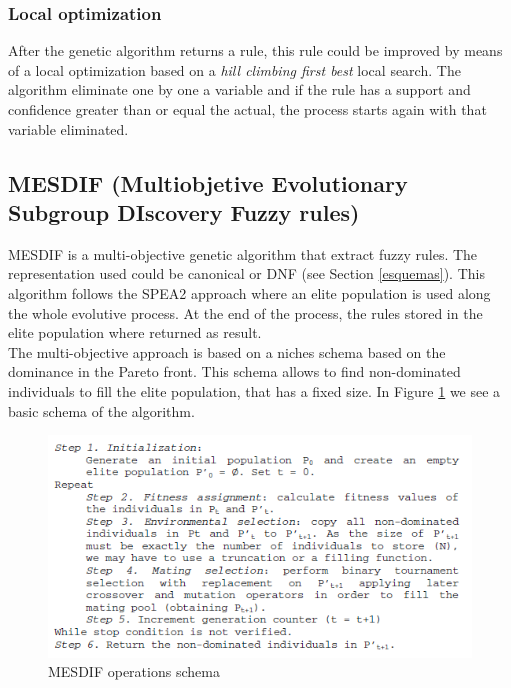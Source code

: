 \documentclass[]{article}
\begin{document}
\subsubsection{Local optimization}\label{local-optimization}

After the genetic algorithm returns a rule, this rule could be improved
by means of a local optimization based on a \emph{hill climbing first
best} local search. The algorithm eliminate one by one a variable and if
the rule has a support and confidence greater than or equal the actual,
the process starts again with that variable eliminated.

\subsection{MESDIF (Multiobjetive Evolutionary Subgroup DIscovery Fuzzy
rules)}\label{mesdif-multiobjetive-evolutionary-subgroup-discovery-fuzzy-rules}

MESDIF is a multi-objective genetic algorithm that extract fuzzy rules.
The representation used could be canonical or DNF (see Section
\ref{esquemas}). This algorithm follows the SPEA2 \cite{spea} approach
where an elite population is used along the whole evolutive process. At
the end of the process, the rules stored in the elite population where
returned as result.\\The multi-objective approach is based on a niches
schema based on the dominance in the Pareto front. This schema allows to
find non-dominated individuals to fill the elite population, that has a
fixed size. In Figure \ref{MESDIFEsquema} we see a basic schema of the
algorithm.

\begin{figure}[htbp]
  \centering 
  \includegraphics{MESDIFSchema.png}
  \caption{MESDIF operations schema}
  \label{MESDIFEsquema}
\end{figure}
\end{document}

